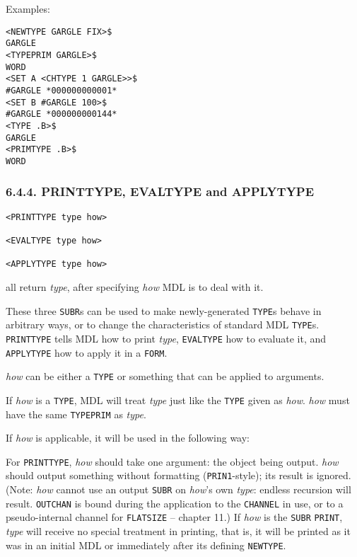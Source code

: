 \documentclass[a4paper,]{article}
\begin{document}
Examples:

\begin{verbatim}
<NEWTYPE GARGLE FIX>$
GARGLE
<TYPEPRIM GARGLE>$
WORD
<SET A <CHTYPE 1 GARGLE>>$
#GARGLE *000000000001*
<SET B #GARGLE 100>$
#GARGLE *000000000144*
<TYPE .B>$
GARGLE
<PRIMTYPE .B>$
WORD
\end{verbatim}

\subsubsection{6.4.4. PRINTTYPE, EVALTYPE and APPLYTYPE}\label{printtype-evaltype-and-applytype}

\begin{verbatim}
<PRINTTYPE type how>

<EVALTYPE type how>

<APPLYTYPE type how>
\end{verbatim}

all return \emph{type}, after specifying \emph{how} MDL is to deal with it.

These three \texttt{SUBR}s can be used to make newly-generated \texttt{TYPE}s behave in arbitrary ways, or to change the
characteristics of standard MDL \texttt{TYPE}s. \texttt{PRINTTYPE} tells MDL how to print
\emph{type}, \texttt{EVALTYPE} how to evaluate it, and
\texttt{APPLYTYPE} how to apply it in a \texttt{FORM}.

\emph{how} can be either a \texttt{TYPE} or something that can be applied to arguments.

If \emph{how} is a \texttt{TYPE}, MDL will treat \emph{type} just like the \texttt{TYPE} given as \emph{how}. \emph{how}
must have the same \texttt{TYPEPRIM} as \emph{type}.

If \emph{how} is applicable, it will be used in the following way:

For \texttt{PRINTTYPE}, \emph{how} should take one argument: the object being output. \emph{how} should output something
without formatting (\texttt{PRIN1}-style); its result is ignored. (Note: \emph{how} cannot use an output \texttt{SUBR} on
\emph{how}'s own \emph{type}: endless recursion will result. \texttt{OUTCHAN} is bound during the
application to the \texttt{CHANNEL} in use, or to a pseudo-internal channel for \texttt{FLATSIZE} -- chapter 11.) If
\emph{how} is the \texttt{SUBR} \texttt{PRINT}, \emph{type} will receive no special treatment in
printing, that is, it will be printed as it was in an initial MDL or immediately after its defining \texttt{NEWTYPE}.
\end{document}
